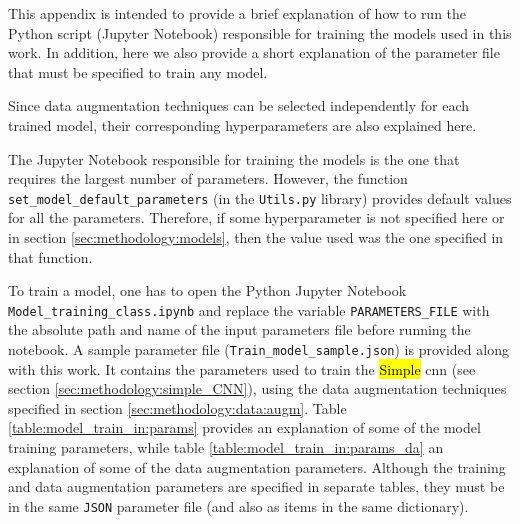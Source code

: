 
\glsresetall

This appendix is intended to provide a brief explanation of how to run the Python script (Jupyter Notebook) responsible for training the models used in this work. In addition, here we also provide a short explanation of the parameter file that must be specified to train any model.

Since data augmentation techniques can be selected independently for each trained model, their corresponding hyperparameters are also explained here.

The Jupyter Notebook responsible for training the models is the one that requires the largest number of parameters. However, the function \texttt{set\_model\_default\_parameters} (in the \texttt{Utils.py} library) provides default values for all the parameters. Therefore, if some hyperparameter is not specified here or in section \ref{sec:methodology:models}, then the value used was the one specified in that function.

To train a model, one has to open the Python Jupyter Notebook \\
\noindent\texttt{Model\_training\_class.ipynb} and replace the variable \texttt{PARAMETERS\_FILE} with the absolute path and name of the input parameters file before running the notebook. A sample parameter file (\texttt{Train\_model\_sample.json}) is provided along with this work. It contains the parameters used to train the \hl{Simple} \gls{cnn} (see section \ref{sec:methodology:simple_CNN}), using the data augmentation techniques specified in section \ref{sec:methodology:data:augm}.
Table \ref{table:model_train_in:params} provides an explanation of some of the model training parameters, while table \ref{table:model_train_in:params_da} an explanation of some of the data augmentation parameters. Although the training and data augmentation parameters are specified in separate tables, they must be in the same \texttt{JSON} parameter file (and also as items in the same dictionary).

\setlength{\mylinewidth}{\linewidth-7pt}%
\setlength{\mylengtha}{0.3\mylinewidth-2\arraycolsep}%
\setlength{\mylengthb}{0.7\mylinewidth-2\arraycolsep}%

